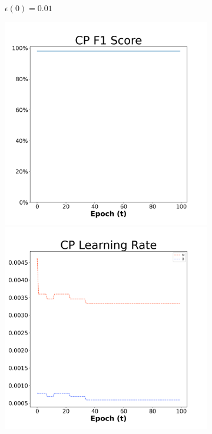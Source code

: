\begin{figure}[H]
\begin{subfigure}{0.3\textwidth}
  \caption{$\epsilon(0)=0.01$}
\end{subfigure}\hfil %
\begin{subfigure}{0.3\textwidth}
  \includegraphics[width=\linewidth]{images/exper2/breast/CP_0.03_f1.png}
  \includegraphics[width=\linewidth]{images/exper2/breast/CP_0.03_lr.png}

\end{subfigure}
\end{figure}
